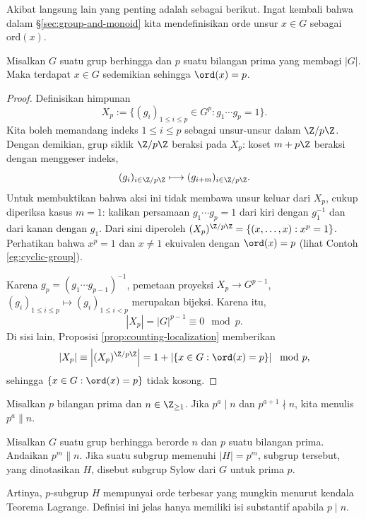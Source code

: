 Akibat langsung lain yang penting adalah sebagai berikut. Ingat kembali bahwa dalam \S\ref{sec:group-and-monoid} kita mendefinisikan orde unsur $x \in G$ sebagai $\text{ord}(x)$.
\begin{corollary}\label{prop:group-Cauchy}
	Misalkan $G$ suatu grup berhingga dan $p$ suatu bilangan prima yang membagi $|G|$. Maka terdapat $x \in G$ sedemikian sehingga $\ord(x)=p$.
\end{corollary}
\begin{proof}
	Definisikan himpunan
	\[ X_p := \{(g_i)_{1 \leq i \leq p} \in G^p : g_1 \cdots g_p = 1 \}. \]
	Kita boleh memandang indeks $1 \leq i \leq p$ sebagai unsur-unsur dalam $\Z/p\Z$. Dengan demikian, grup siklik $\Z/p\Z$ beraksi pada $X_p$: koset $m + p\Z$ beraksi dengan menggeser indeks,
	\[ (g_i)_{i \in \Z/p\Z} \longmapsto (g_{i+m})_{i \in \Z/p\Z}. \]
	Untuk membuktikan bahwa aksi ini tidak membawa unsur keluar dari $X_p$, cukup diperiksa kasus $m=1$: kalikan persamaan $g_1 \cdots g_p = 1$ dari kiri dengan $g_1^{-1}$ dan dari kanan dengan $g_1$. Dari sini diperoleh $(X_p)^{\Z/p\Z} = \{(x, \ldots, x) : x^p = 1 \}$. Perhatikan bahwa $x^p=1$ dan $x \neq 1$ ekuivalen dengan $\ord(x)=p$ (lihat Contoh \ref{eg:cyclic-group}).

	Karena $g_p = (g_1 \cdots g_{p-1})^{-1}$, pemetaan proyeksi $X_p \to G^{p-1}$, $(g_i)_{1 \leq i \leq p} \mapsto (g_i)_{1 \leq i < p}$ merupakan bijeksi. Karena itu,
	\[ |X_p| = |G|^{p-1} \equiv 0 \mod p. \]
	Di sisi lain, Proposisi \ref{prop:counting-localization} memberikan
	\[ |X_p| \equiv \left\lvert(X_p)^{\Z/p\Z}\right\rvert = 1 + \left\lvert \{x \in G : \ord(x)=p \} \right\rvert \mod p , \]
	sehingga $\{x \in G : \ord(x)=p \}$ tidak kosong.
\end{proof}

\begin{convention}
	Misalkan $p$ bilangan prima dan $n \in \Z_{\geq 1}$. Jika $p^a \mid n$ dan $p^{a+1} \nmid n$, kita menulis $p^a \| n$.
\end{convention}

\begin{definition}
	Misalkan $G$ suatu grup berhingga berorde $n$ dan $p$ suatu bilangan prima. Andaikan $p^m \| n$. Jika suatu subgrup memenuhi $|H|=p^m$, subgrup tersebut, yang dinotasikan $H$, disebut subgrup Sylow dari $G$ untuk prima $p$.
\end{definition}
Artinya, $p$-subgrup $H$ mempunyai orde terbesar yang mungkin menurut kendala Teorema Lagrange. Definisi ini jelas hanya memiliki isi substantif apabila $p \mid n$.

